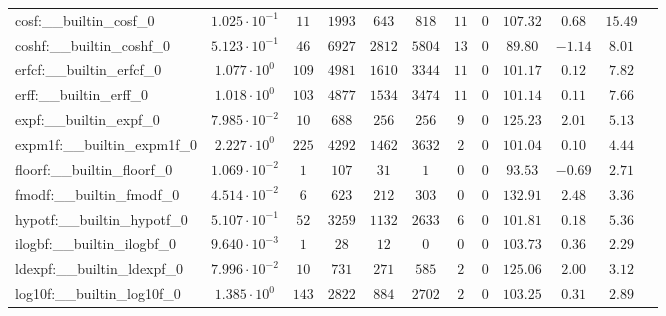\begin{tabular}{|l|c|c|c|c|c|c|c|c|c|c|c|}
cosf:\_\_builtin\_cosf\_0                 & $ 1.025 \cdot 10^{-1} $ & $ 11     $ & $ 1993   $ & $ 643   $ & $ 818   $ & $ 11  $ & $ 0 $ & $ 107.32      $ & $ 0.68    $ & $ 15.49   $ \\
coshf:\_\_builtin\_coshf\_0               & $ 5.123 \cdot 10^{-1} $ & $ 46     $ & $ 6927   $ & $ 2812  $ & $ 5804  $ & $ 13  $ & $ 0 $ & $ 89.80       $ & $ -1.14   $ & $ 8.01    $ \\
erfcf:\_\_builtin\_erfcf\_0               & $ 1.077 \cdot 10^{0}  $ & $ 109    $ & $ 4981   $ & $ 1610  $ & $ 3344  $ & $ 11  $ & $ 0 $ & $ 101.17      $ & $ 0.12    $ & $ 7.82    $ \\
erff:\_\_builtin\_erff\_0                 & $ 1.018 \cdot 10^{0}  $ & $ 103    $ & $ 4877   $ & $ 1534  $ & $ 3474  $ & $ 11  $ & $ 0 $ & $ 101.14      $ & $ 0.11    $ & $ 7.66    $ \\
expf:\_\_builtin\_expf\_0                 & $ 7.985 \cdot 10^{-2} $ & $ 10     $ & $ 688    $ & $ 256   $ & $ 256   $ & $ 9   $ & $ 0 $ & $ 125.23      $ & $ 2.01    $ & $ 5.13    $ \\
expm1f:\_\_builtin\_expm1f\_0             & $ 2.227 \cdot 10^{0}  $ & $ 225    $ & $ 4292   $ & $ 1462  $ & $ 3632  $ & $ 2   $ & $ 0 $ & $ 101.04      $ & $ 0.10    $ & $ 4.44    $ \\
floorf:\_\_builtin\_floorf\_0             & $ 1.069 \cdot 10^{-2} $ & $ 1      $ & $ 107    $ & $ 31    $ & $ 1     $ & $ 0   $ & $ 0 $ & $ 93.53       $ & $ -0.69   $ & $ 2.71    $ \\
fmodf:\_\_builtin\_fmodf\_0               & $ 4.514 \cdot 10^{-2} $ & $ 6      $ & $ 623    $ & $ 212   $ & $ 303   $ & $ 0   $ & $ 0 $ & $ 132.91      $ & $ 2.48    $ & $ 3.36    $ \\
hypotf:\_\_builtin\_hypotf\_0             & $ 5.107 \cdot 10^{-1} $ & $ 52     $ & $ 3259   $ & $ 1132  $ & $ 2633  $ & $ 6   $ & $ 0 $ & $ 101.81      $ & $ 0.18    $ & $ 5.36    $ \\
ilogbf:\_\_builtin\_ilogbf\_0             & $ 9.640 \cdot 10^{-3} $ & $ 1      $ & $ 28     $ & $ 12    $ & $ 0     $ & $ 0   $ & $ 0 $ & $ 103.73      $ & $ 0.36    $ & $ 2.29    $ \\
ldexpf:\_\_builtin\_ldexpf\_0             & $ 7.996 \cdot 10^{-2} $ & $ 10     $ & $ 731    $ & $ 271   $ & $ 585   $ & $ 2   $ & $ 0 $ & $ 125.06      $ & $ 2.00    $ & $ 3.12    $ \\
log10f:\_\_builtin\_log10f\_0             & $ 1.385 \cdot 10^{0}  $ & $ 143    $ & $ 2822   $ & $ 884   $ & $ 2702  $ & $ 2   $ & $ 0 $ & $ 103.25      $ & $ 0.31    $ & $ 2.89    $ \\

\end{tabular}
